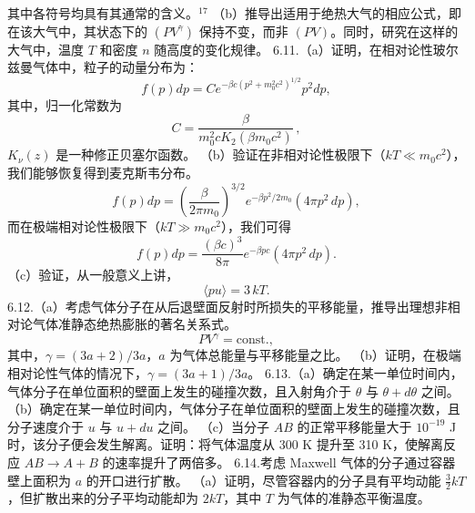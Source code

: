 其中各符号均具有其通常的含义。\(^{17}\)
（b）推导出适用于绝热大气的相应公式，即在该大气中，其状态下的 \((PV^{\gamma})\) 保持不变，而非 \((PV)\)。同时，研究在这样的大气中，温度 \(T\) 和密度 \(n\) 随高度的变化规律。
6.11.（a）证明，在相对论性玻尔兹曼气体中，粒子的动量分布为：
\begin{equation}\tag{6.6.27}\label{eq:6.6.27}
f ( p ) d p = C e ^{- \beta c ( p ^ { 2} + m _ { 0 } ^{2} c ^{2} ) ^{1 / 2} } p ^{2} d p ,
\end{equation}
其中，归一化常数为
\begin{equation}\tag{6.6.28}\label{eq:6.6.28}
C = \frac { \beta } { m _ { 0 } ^{2} c K _ { 2 } ( \beta m _ { 0 } c ^{2} ) } \, ,
\end{equation}
\(K_{\nu}(z)\) 是一种修正贝塞尔函数。
（b）验证在非相对论性极限下（\(kT \ll m_0c^2\)），我们能够恢复得到麦克斯韦分布。
\begin{equation}\tag{6.6.29}\label{eq:6.6.29}
f ( p ) d p = \left( \frac { \beta } { 2 \pi m _ { 0 } } \right) ^{3 / 2} e ^{- \beta p ^ { 2} / 2 m _ { 0 } } ( 4 \pi p ^{2} \, d p ) ,
\end{equation}
而在极端相对论性极限下（\(kT \gg m_0c^2\)），我们可得
\begin{equation}\tag{6.6.30}\label{eq:6.6.30}
f ( p ) d p = { \frac { ( \beta c ) ^{3} } { 8 \pi } } e ^{- \beta p c} ( 4 \pi p ^{2} \, d p ) .
\end{equation}
（c）验证，从一般意义上讲，
\begin{equation}\tag{6.6.31}\label{eq:6.6.31}
\langle p u \rangle = 3 \, k T .
\end{equation}
6.12.（a）考虑气体分子在从后退壁面反射时所损失的平移能量，推导出理想非相对论气体准静态绝热膨胀的著名关系式。
\begin{equation}\tag{6.6.32}\label{eq:6.6.32}
P V ^{\gamma} = \mathrm { c o n s t . } ,
\end{equation}
其中，\(\gamma = (3a+2)/3a\)，\(a\) 为气体总能量与平移能量之比。
（b）证明，在极端相对论性气体的情况下，\(\gamma = (3a+1)/3a\)。
6.13.（a）确定在某一单位时间内，气体分子在单位面积的壁面上发生的碰撞次数，且入射角介于 \(\theta\) 与 \(\theta + d\theta\) 之间。
（b）确定在某一单位时间内，气体分子在单位面积的壁面上发生的碰撞次数，且分子速度介于 \(u\) 与 \(u + du\) 之间。
（c）当分子 \(AB\) 的正常平移能量大于 \(10^{-19}\) J 时，该分子便会发生解离。证明：将气体温度从 300 K 提升至 310 K，使解离反应 \(AB \rightarrow A + B\) 的速率提升了两倍多。
6.14.考虑 Maxwell 气体的分子通过容器壁上面积为 \(a\) 的开口进行扩散。
（a）证明，尽管容器内的分子具有平均动能 \(\frac{3}{2}kT\)，但扩散出来的分子平均动能却为 \(2kT\)，其中 \(T\) 为气体的准静态平衡温度。

